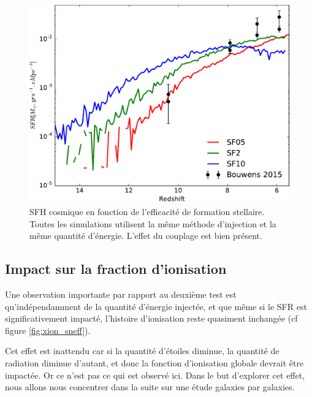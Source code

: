 \begin{figure}
        \includegraphics[width=.95\textwidth]{img/03/sedov/SFR_sfeff.pdf} 
        \caption[SFH cosmique en fonction de l'efficacité de formation stellaire]{SFH cosmique en fonction de l'efficacité de formation stellaire.
        Toutes les simulations utilisent la même méthode d'injection et la même quantité d'énergie.
		L'effet du couplage est bien présent.
        }
 		\label{fig:sfr_sfe}
\end{figure}

\subsection{Impact sur la fraction d'ionisation}
\label{sec:pbfesc}
Une observation importante par rapport au deuxième test est qu’indépendamment de la quantité d'énergie injectée, et que même si le \ac{SFR} est significativement impacté, l'histoire d'ionisation reste quasiment inchangée (cf figure \ref{fig:xion_sneff}).

Cet effet est inattendu car si la quantité d'étoiles diminue, la quantité de radiation diminue d'autant, et donc la fonction d'ionisation globale devrait être impactée.
Or ce n'est pas ce qui est observé ici.
Dans le but d'explorer cet effet, nous allons nous concentrer dans la suite sur une étude galaxies par galaxies.

